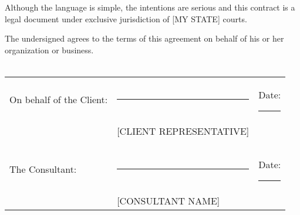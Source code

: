 \documentclass[10pt,a4paper,parskip]{scrartcl}
\begin{document}
Although the language is simple, the intentions are serious and this contract
is a legal document under exclusive jurisdiction of [MY STATE] courts.


\vspace{1cm}

\noindent The undersigned agrees to the terms of this agreement on behalf of
his or her organization or business.\\\\

\noindent \begin{tabular}{l l l}
On behalf of the Client: & \rule{6cm}{.2pt}        & Date: \rule{2.4cm}{.2pt}\\
                         & [CLIENT REPRESENTATIVE] & \\\\\\
The Consultant:          & \rule{6cm}{.2pt}        & Date: \rule{2.4cm}{.2pt}\\
                         & [CONSULTANT NAME]       & \\
\end{tabular}
\end{document}
